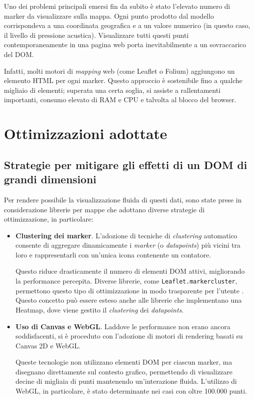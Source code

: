 Uno dei problemi principali emersi fin da subito è stato l'elevato numero di marker da visualizzare sulla mappa. Ogni punto prodotto dal modello corrispondeva a una coordinata geografica e a un valore numerico (in questo caso, il livello di pressione acustica). Visualizzare tutti questi punti contemporaneamente in una pagina web porta inevitabilmente a un sovraccarico del DOM.

Infatti, molti motori di \textit{mapping} web (come Leaflet o Folium) aggiungono un elemento HTML per ogni marker. Questo approccio è sostenibile fino a qualche migliaio di elementi; superata una certa soglia, si assiste a rallentamenti importanti, consumo elevato di RAM e CPU e talvolta al blocco del browser. \cite{folium-react}


\section{Ottimizzazioni adottate}

\subsection{Strategie per mitigare gli effetti di un DOM di grandi dimensioni}

Per rendere possibile la visualizzazione fluida di questi dati, sono state prese in considerazione librerie per mappe che adottano diverse strategie di ottimizzazione, in particolare:

\begin{itemize}
  \item \textbf{Clustering dei marker}. L'adozione di tecniche di \textit{clustering} automatico consente di aggregare dinamicamente i \textit{marker} (o \textit{datapoints}) più vicini tra loro e rappresentarli con un'unica icona contenente un contatore. 
  
  Questo riduce drasticamente il numero di elementi DOM attivi, migliorando la performance percepita. Diverse librerie, come \texttt{Leaflet.markercluster}, permettono questo tipo di ottimizzazione in modo trasparente per l'utente \cite{leaflet-clustering}. Questo concetto può essere esteso anche alle librerie che implementano una Heatmap, dove viene gestito il \textit{clustering} dei \textit{datapoints}.

  \item \textbf{Uso di Canvas e WebGL}. Laddove le performance non erano ancora soddisfacenti, si è proceduto con l'adozione di motori di rendering basati su Canvas 2D e WebGL. 
  
  Queste tecnologie non utilizzano elementi DOM per ciascun marker, ma disegnano direttamente sul contesto grafico, permettendo di visualizzare decine di migliaia di punti mantenendo un'interazione fluida. L'utilizzo di WebGL, in particolare, è stato determinante nei casi con oltre 100.000 punti. \cite{deckgl-webgl}
\end{itemize}